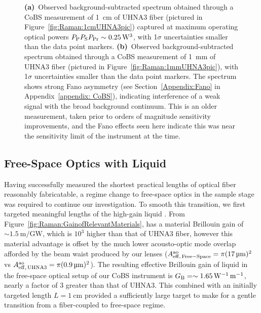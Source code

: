 \begin{figure}[h!]
\begin{subfigure}[b]{0.49\textwidth}
    \caption{}
    \label{fig:Raman:1mmUHNA3}
  \end{subfigure}
  \caption[\ac{CoBS} measurements of \SI{1}{\centi\meter} and \SI{1}{\milli\meter} \ac{UHNA3} fiber, in pursuit of observing Brillouin-induced Raman modes.]{\textbf{(a)}~Observed background-subtracted spectrum obtained through a \ac{CoBS} measurement of \SI{1}{\centi\meter} of \ac{UHNA3} fiber (pictured in Figure~\ref{fig:Raman:1cmUHNA3pic}) captured at maximum operating optical powers \(P_{\rm P}P_{\rm S}P_{\rm Pr} \sim \SI{0.25}{\cubic\watt}\), with 1\(\sigma\) uncertainties smaller than the data point markers. \textbf{(b)}~Observed background-subtracted spectrum obtained through a \ac{CoBS} measurement of \SI{1}{\milli\meter} of \ac{UHNA3} fiber (pictured in Figure~\ref{fig:Raman:1mmUHNA3pic}), with 1\(\sigma\) uncertainties smaller than the data point markers. The spectrum shows strong Fano asymmetry (see Section~\ref{Appendix:Fano} in Appendix~\ref{appendix: CoBS}), indicating interference of a weak signal with the broad background continuum. This is an older measurement, taken prior to orders of magnitude sensitivity improvements, and the Fano effects seen here indicate this was near the sensitivity limit of the instrument at the time.}
  \label{fig:Raman:UHNA3}
\end{figure}

\subsection{Free-Space Optics with Liquid }
\label{subsec:Raman:Target:CS2Vial}

Having successfully measured the shortest practical lengths of optical fiber reasonably fabricatable, a regime change to free-space optics in the sample stage was required to continue our investigation. To smooth this transition, we first targeted meaningful lengths of the high-gain liquid . From Figure~\ref{fig:Raman:GainofRelevantMaterials},  has a material Brillouin gain of \(\sim\SI{1.5}{\meter\per\giga\watt}\), which is \(10^{3}\) higher than that of \ac{UHNA3} fiber, however this material advantage is offset by the much lower acousto-optic mode overlap afforded by the beam waist produced by our lenses (\(A_{\rm eff,\,Free-Space}^{\rm ao} = \pi(\SI{17}{\micro\meter})^{2}\) vs \(A_{\rm eff,\,UHNA3}^{\rm ao} = \pi(\SI{0.9}{\micro\meter})^{2}\)). The resulting effective Brillouin gain of liquid  in the free-space optical setup of our \ac{CoBS} instrument is \(G_{\rm B} = \sim\SI{1.65}{\per\watt\per\meter}\), nearly a factor of 3 greater than that of \ac{UHNA3}. This combined with an initially targeted length \(L = \SI{1}{\centi\meter}\) provided a sufficiently large target to make for a gentle transition from a fiber-coupled to free-space regime.

